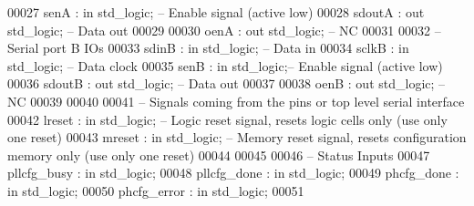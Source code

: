 \begin{DoxyCode}
00027       \textcolor{vhdlchar}{senA}     \textcolor{vhdlchar}{:} \textcolor{keywordflow}{in} \textcolor{comment}{std\_logic};\textcolor{keyword}{ -- Enable signal (active low)}
00028       \textcolor{vhdlchar}{sdoutA}   \textcolor{vhdlchar}{:} \textcolor{keywordflow}{out} \textcolor{comment}{std\_logic};\textcolor{keyword}{ -- Data out}
00029       
00030       \textcolor{vhdlchar}{oenA}     \textcolor{vhdlchar}{:} \textcolor{keywordflow}{out} \textcolor{comment}{std\_logic};\textcolor{keyword}{ -- NC}
00031       
00032 \textcolor{keyword}{      -- Serial port B IOs}
00033       \textcolor{vhdlchar}{sdinB}    \textcolor{vhdlchar}{:} \textcolor{keywordflow}{in} \textcolor{comment}{std\_logic};\textcolor{keyword}{ -- Data in}
00034       \textcolor{vhdlchar}{sclkB}    \textcolor{vhdlchar}{:} \textcolor{keywordflow}{in} \textcolor{comment}{std\_logic};\textcolor{keyword}{ -- Data clock}
00035       \textcolor{vhdlchar}{senB}     \textcolor{vhdlchar}{:} \textcolor{keywordflow}{in} \textcolor{comment}{std\_logic};\textcolor{keyword}{-- Enable signal (active low)}
00036       \textcolor{vhdlchar}{sdoutB}   \textcolor{vhdlchar}{:} \textcolor{keywordflow}{out} \textcolor{comment}{std\_logic};\textcolor{keyword}{ -- Data out}
00037       
00038       \textcolor{vhdlchar}{oenB}     \textcolor{vhdlchar}{:} \textcolor{keywordflow}{out} \textcolor{comment}{std\_logic};\textcolor{keyword}{ -- NC}
00039       
00040       
00041 \textcolor{keyword}{      -- Signals coming from the pins or top level serial interface}
00042       \textcolor{vhdlchar}{lreset}   \textcolor{vhdlchar}{:} \textcolor{keywordflow}{in} \textcolor{comment}{std\_logic};\textcolor{keyword}{ -- Logic reset signal, resets logic cells only  (use only one reset)}
00043       \textcolor{vhdlchar}{mreset}   \textcolor{vhdlchar}{:} \textcolor{keywordflow}{in} \textcolor{comment}{std\_logic};\textcolor{keyword}{ -- Memory reset signal, resets configuration memory only (use only one
       reset)}
00044       
00045       
00046 \textcolor{keyword}{      -- Status Inputs}
00047       \textcolor{vhdlchar}{pllcfg_busy}    \textcolor{vhdlchar}{:} \textcolor{keywordflow}{in} \textcolor{comment}{std\_logic};
00048       \textcolor{vhdlchar}{pllcfg_done}    \textcolor{vhdlchar}{:} \textcolor{keywordflow}{in} \textcolor{comment}{std\_logic};
00049       \textcolor{vhdlchar}{phcfg_done}     \textcolor{vhdlchar}{:} \textcolor{keywordflow}{in} \textcolor{comment}{std\_logic};
00050       \textcolor{vhdlchar}{phcfg_error}    \textcolor{vhdlchar}{:} \textcolor{keywordflow}{in} \textcolor{comment}{std\_logic};
00051       

\end{DoxyCode}
